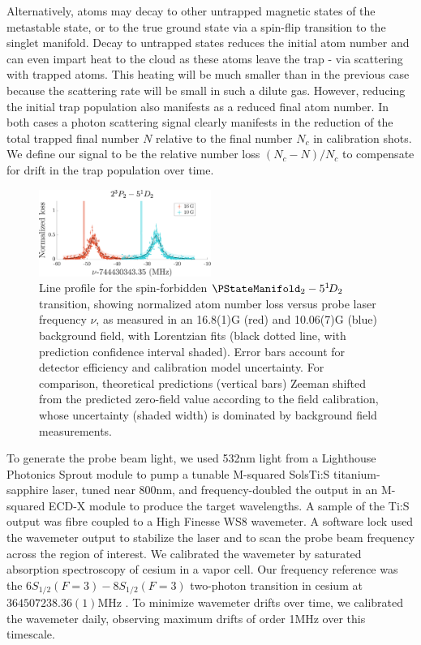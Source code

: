 Alternatively, atoms may decay to other untrapped magnetic states of the metastable state, or to the true ground state via a spin-flip transition to the singlet manifold. Decay to untrapped states reduces the initial atom number and can even impart heat to the cloud as these atoms leave the trap - via scattering with trapped atoms. This heating will be much smaller than in the previous case because the scattering rate will be small in such a dilute gas. However, reducing the initial trap population also manifests as a reduced final atom number. In both cases a photon scattering signal clearly manifests in the reduction of the total trapped final number $N$ relative to the final number $N_c$ in calibration shots. We define our signal to be the relative number loss $(N_c-N)/N_c$ to compensate for drift in the trap population over time.



\begin{figure}[t]
    \centering
    \includegraphics[width=0.5\textwidth]{fig/spectroscopy/ci-plot-51D2-eps-converted-to.pdf}
    \caption{Line profile for the spin-forbidden $\PStateManifold_2 -  5^{1\!}D_2$ transition, showing normalized atom number loss versus probe laser frequency $\nu$, as measured in an {16.8(1)}G (red) and {10.06(7)}G (blue) background field, with Lorentzian fits (black dotted line, with prediction confidence interval shaded). Error bars account for detector efficiency and calibration model uncertainty. For comparison, theoretical predictions (vertical bars) Zeeman shifted from the predicted zero-field value \cite{Drake07} according to the field calibration, whose uncertainty (shaded width) is dominated by background field measurements.}
    \label{fig:1D_2_line}
  \end{figure}


To generate the probe beam light, we used 532nm light from a Lighthouse Photonics Sprout module to pump a tunable M-squared SolsTi:S titanium-sapphire laser, tuned near 800nm, and frequency-doubled the output in an M-squared ECD-X module to produce the target wavelengths. A sample of the Ti:S output was fibre coupled to a High Finesse WS8 wavemeter. A software lock used the wavemeter output to stabilize the laser and to scan the probe beam frequency across the region of interest. We calibrated the wavemeter by saturated absorption spectroscopy of cesium in a vapor cell. Our frequency reference was the $6S_{1/2}(F=3)-8S_{1/2}(F=3)$ two-photon transition in cesium at $364507238.36(1)$MHz \cite{Wu13}. To minimize wavemeter drifts over time, we calibrated the wavemeter daily, observing maximum drifts of order 1MHz over this timescale. 


